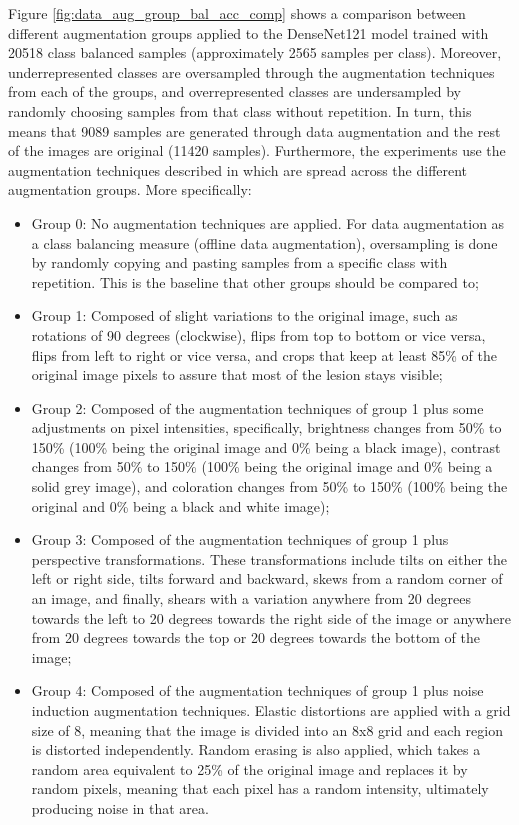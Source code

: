     Figure \ref{fig:data_aug_group_bal_acc_comp} shows a comparison between different augmentation groups applied to the DenseNet121 model trained with 20518 class balanced samples (approximately 2565 samples per class). Moreover, underrepresented classes are oversampled through the augmentation techniques from each of the groups, and overrepresented classes are undersampled by randomly choosing samples from that class without repetition. In turn, this means that 9089 samples are generated through data augmentation and the rest of the images are original (11420 samples). Furthermore, the experiments use the augmentation techniques described in  which are spread across the different augmentation groups. More specifically:
    \begin{itemize}
        \item Group 0: No augmentation techniques are applied. For data augmentation as a class balancing measure (offline data augmentation), oversampling is done by randomly copying and pasting samples from a specific class with repetition. This is the baseline that other groups should be compared to;
        \item Group 1: Composed of slight variations to the original image, such as rotations of 90 degrees (clockwise), flips from top to bottom or vice versa, flips from left to right or vice versa, and crops that keep at least 85\% of the original image pixels to assure that most of the lesion stays visible;
        \item Group 2: Composed of the augmentation techniques of group 1 plus some adjustments on pixel intensities, specifically, brightness changes from 50\% to 150\% (100\% being the original image and 0\% being a black image), contrast changes from 50\% to 150\% (100\% being the original image and 0\% being a solid grey image), and coloration changes from 50\% to 150\% (100\% being the original and 0\% being a black and white image);
        \item Group 3: Composed of the augmentation techniques of group 1 plus perspective transformations. These transformations include tilts on either the left or right side, tilts forward and backward, skews from a random corner of an image, and finally, shears with a variation anywhere from 20 degrees towards the left to 20 degrees towards the right side of the image or anywhere from 20 degrees towards the top or 20 degrees towards the bottom of the image;
        \item Group 4: Composed of the augmentation techniques of group 1 plus noise induction augmentation techniques. Elastic distortions are applied with a grid size of 8, meaning that the image is divided into an 8x8 grid and each region is distorted independently. Random erasing is also applied, which takes a random area equivalent to 25\% of the original image and replaces it by random pixels, meaning that each pixel has a random intensity, ultimately producing noise in that area.
    \end{itemize}
